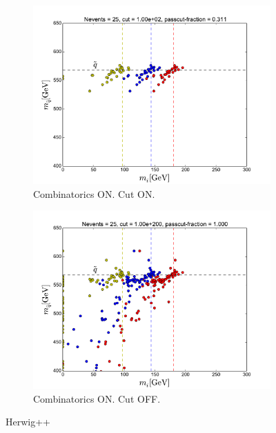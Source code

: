 \documentclass[twoside,english]{uiofysmaster}
\begin{document}
\begin{figure}[hbt]
	\begin{subfigure}[b]{0.49\textwidth}
		\includegraphics[width=\textwidth]{figures/making-sense/herwig_combinatorics-ON_cut-100.pdf} 
		\caption{Combinatorics ON. Cut ON.}
	\end{subfigure}
	\begin{subfigure}[b]{0.49\textwidth}
		\includegraphics[width=\textwidth]{figures/making-sense/herwig_combinatorics-ON_nocut.pdf} 
		\caption{Combinatorics ON. Cut OFF.}
	\end{subfigure}
	\caption{Herwig++}
\end{figure}
\end{document}
